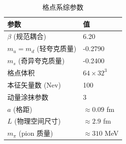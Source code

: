 \documentclass[12pt,a4paper]{ctexart}
\begin{document}
\begin{table}[H]
\centering
\caption{格点系综参数}
\begin{tabular}{ll}
\toprule
\textbf{参数} & \textbf{值} \\
\midrule
$\beta$ (规范耦合) & 6.20 \\
$m_u = m_d$ (轻夸克质量) & -0.2790 \\
$m_s$ (奇异夸克质量) & -0.2400 \\
格点体积 & $64 \times 32^3$ \\
本征矢量数 (Nev) & 100 \\
动量涂抹参数 & 3 \\
$a$ (格距) & $\approx 0.09$ fm \\
$L$ (物理空间尺寸) & $\approx 2.9$ fm \\
$m_\pi$ (pion 质量) & $\approx 310$ MeV \\
\bottomrule
\end{tabular}
\end{table}
\end{document}
